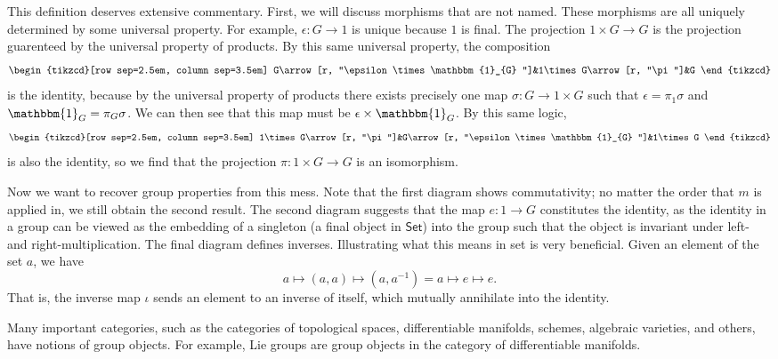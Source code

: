 This definition deserves extensive commentary. First, we will discuss morphisms that are not named. These morphisms are all uniquely determined by some universal property. For example, $\epsilon : G\to 1$ is unique because $1$ is final. The projection $1\times G\to G$ is the projection guarenteed by the universal property of products. By this same universal property, the composition
\[\begin{tikzcd}[row sep=2.5em, column sep=3.5em]
	G\arrow[r, "\epsilon \times \mathbbm{1}_{G}  "]&1\times G\arrow[r, "\pi "]&G
\end{tikzcd}\]
is the identity, because by the universal property of products there exists precisely one map $\sigma : G \to 1\times G$ such that $\epsilon =\pi_1 \sigma $ and $\mathbbm{1}_{G} =\pi_G \sigma $. We can then see that this map must be $\epsilon \times \mathbbm{1}_{G} $. By this same logic,
\[\begin{tikzcd}[row sep=2.5em, column sep=3.5em]
	1\times G\arrow[r, "\pi "]&G\arrow[r, "\epsilon \times \mathbbm{1}_{G} "]&1\times G
\end{tikzcd}\]
is also the identity, so we find that the projection $\pi : 1\times G \to G$ is an isomorphism.

Now we want to recover group properties from this mess. Note that the first diagram shows commutativity; no matter the order that $m$ is applied in, we still obtain the second result. The second diagram suggests that the map $e : 1 \to G$ constitutes the identity, as the identity in a group can be viewed as the embedding of a singleton (a final object in $\mathsf{Set}$) into the group such that the object is invariant under left- and right-multiplication. The final diagram defines inverses. Illustrating what this means in set is very beneficial. Given an element of the set $a$, we have
\[
	a \mapsto (a,a) \mapsto (a,a^{-1}) = a \mapsto e \mapsto  e
.\]
That is, the inverse map  $\iota $ sends an element to an inverse of itself, which mutually annihilate into the identity.

Many important categories, such as the categories of topological spaces, differentiable manifolds, schemes, algebraic varieties, and others, have notions of group objects. For example, Lie groups are group objects in the category of differentiable manifolds.
